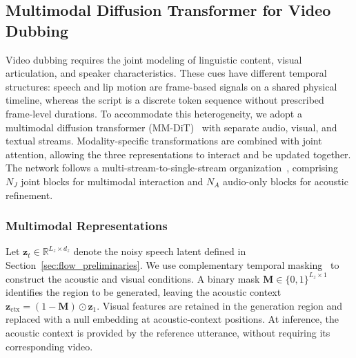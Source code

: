 
\subsection{Multimodal Diffusion Transformer for Video Dubbing}
\label{subsec:mmdit_backbone}
\label{sec:mmdit_dubbing}

Video dubbing requires the joint modeling of linguistic content, visual articulation, and speaker characteristics. These cues have different temporal structures: speech and lip motion are frame-based signals on a shared physical timeline, whereas the script is a discrete token sequence without prescribed frame-level durations. To accommodate this heterogeneity, we adopt a multimodal diffusion transformer (MM-DiT)~\cite{esser2024scaling} with separate audio, visual, and textual streams. Modality-specific transformations are combined with joint attention, allowing the three representations to interact and be updated together. The network follows a multi-stream-to-single-stream organization~\cite{cheng2025mmaudio,yun2026immersivetts}, comprising \(N_J\) joint blocks for multimodal interaction and \(N_A\) audio-only blocks for acoustic refinement.

\subsubsection{Multimodal Representations}

Let \(\mathbf{z}_t\in\mathbb{R}^{L_z\times d_z}\) denote the noisy speech latent defined in Section~\ref{sec:flow_preliminaries}. We use complementary temporal masking~\cite{choi2025aligndit} to construct the acoustic and visual conditions. A binary mask \(\mathbf{M}\in\{0,1\}^{L_z\times1}\) identifies the region to be generated, leaving the acoustic context \(\mathbf{z}_{\mathrm{ctx}}=(1-\mathbf{M})\odot\mathbf{z}_1\). Visual features are retained in the generation region and replaced with a null embedding at acoustic-context positions. At inference, the acoustic context is provided by the reference utterance, without requiring its corresponding video.

